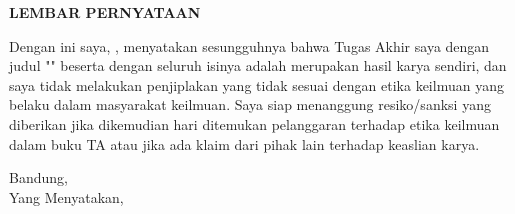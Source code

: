 \begin{center}

    \textbf{\LARGE LEMBAR PERNYATAAN}
    \end{center}
   { \large
    
    \vspace{1cm}
    \noindent Dengan ini saya, \Author, menyatakan sesungguhnya bahwa Tugas Akhir saya dengan judul "\textbf{\Title}" beserta dengan seluruh isinya adalah merupakan hasil karya sendiri, dan saya tidak melakukan penjiplakan yang tidak sesuai dengan etika keilmuan yang belaku dalam masyarakat keilmuan. Saya siap menanggung resiko/sanksi yang diberikan jika dikemudian hari ditemukan pelanggaran terhadap etika keilmuan dalam buku TA atau jika ada klaim dari pihak lain terhadap keaslian karya.\\
    \vspace{2cm}

\begin{flushright} 
Bandung, \Tanggal\quad \Bulan \quad \Tahun\\
Yang Menyatakan,


\vspace{1cm}
\Author
\end{flushright} }
